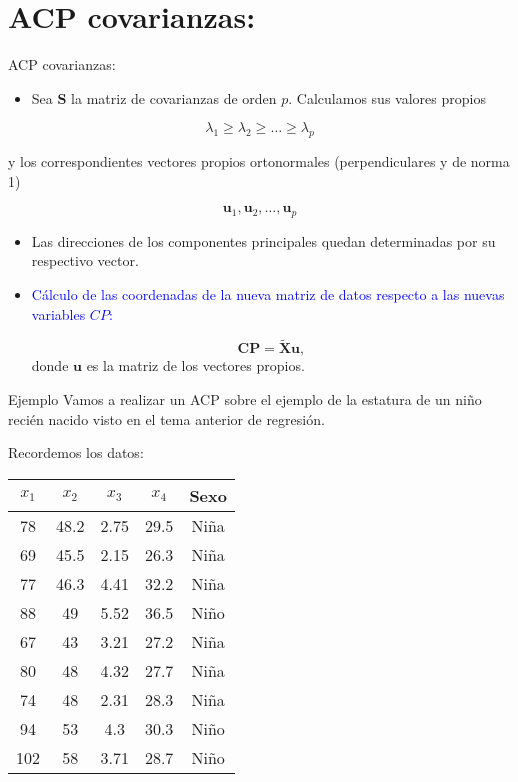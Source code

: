 \documentclass[
  spanish,
  ignorenonframetext,
]{beamer}
\providecommand{\tightlist}{%
  \setlength{\itemsep}{0pt}\setlength{\parskip}{0pt}}
\newcommand\blue[1]{\textcolor{blue}{#1}}
\begin{document}
\hypertarget{acp-covarianzas}{%
\section{ACP covarianzas:}\label{acp-covarianzas}}

\begin{frame}{ACP covarianzas:}
\protect\hypertarget{acp-covarianzas-1}{}
\begin{itemize}
\tightlist
\item
  Sea \(\mathbf{S}\) la matriz de covarianzas de orden \(p\). Calculamos
  sus valores propios
\end{itemize}

\[\lambda_1\geq \lambda_2\geq\ldots\geq\lambda_p\]

y los correspondientes vectores propios ortonormales (perpendiculares y
de norma 1)

\[\mathbf{u}_1,\mathbf{u}_2,\ldots,\mathbf{u}_p\]

\begin{itemize}
\item
  Las direcciones de los componentes principales quedan determinadas por
  su respectivo vector.
\item
  \blue{Cálculo de las coordenadas de la nueva matriz de datos respecto
  a las nuevas variables $CP$:}

  \[\mathbf{CP}= \tilde{\mathbf{X}} \mathbf{u},\] donde \(\mathbf{u}\)
  es la matriz de los vectores propios.
\end{itemize}
\end{frame}

\begin{frame}{Ejemplo}
\protect\hypertarget{ejemplo}{}
Vamos a realizar un ACP sobre el ejemplo de la estatura de un niño
recién nacido visto en el tema anterior de regresión.

Recordemos los datos:

\begin{tabular}{|c|c|c|c|c|}\hline
$x_1$ & $x_2$ & $x_3$ & $x_4$&Sexo\\\hline
78&48.2&2.75&29.5&Niña\\ 69&45.5&2.15&26.3&Niña\\
77&46.3&4.41&32.2&Niña\\ 88&49&5.52&36.5&Niño\\ 67&43&3.21&27.2&Niña\\
80&48&4.32&27.7&Niña\\ 74&48&2.31&28.3&Niña\\ 94&53&4.3&30.3&Niño\\
102&58&3.71&28.7&Niño
\\\hline\end{tabular}
\end{frame}
\end{document}
